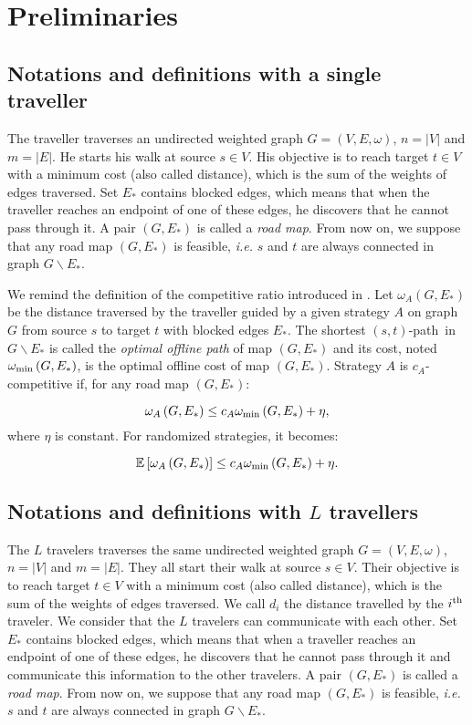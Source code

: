 \documentclass[letter-size, 11pt]{article}
\newcommand{\card}[1]{\left| #1 \right|}
\newcommand{\ith}[1]{#1^{\mbox{\scriptsize{th}}}}
\newcommand{\stpath}{$(s,t)$-path}
\newcommand{\omegamin}{\omega_{\mbox{\scriptsize{min}}}}
\begin{document}
\section{Preliminaries}

\subsection{Notations and definitions with a single traveller} 
The traveller traverses an undirected weighted graph $G=\left(V,E,\omega\right)$, $n = \card{V}$ and $m = \card{E}$. He starts his walk at source $s \in V$. His objective is to reach target $t\in V$ with a minimum cost (also called distance), which is the sum of the weights of edges traversed. Set $E_*$ contains blocked edges, which means that when the traveller reaches an endpoint of one of these edges, he discovers that he cannot pass through it. A pair $\left(G,E_*\right)$ is called a \textit{road map}. From now on, we suppose that any road map $\left(G,E_*\right)$ is feasible, {\em i.e.} $s$ and $t$ are always connected in graph $G\backslash E_*$.

We remind the definition of the competitive ratio introduced in \cite{BoEl98}. Let $\omega_A\left(G,E_*\right)$ be the distance traversed by the traveller guided by a given strategy $A$ on graph $G$ from source $s$ to target $t$ with blocked edges $E_*$. The shortest \stpath ~in $G\backslash E_*$ is called the \textit{optimal offline path} of map $\left(G,E_*\right)$ and its cost, noted $\omegamin\left(G,E_*\right)$, is the optimal offline cost of map $\left(G,E_*\right)$. Strategy $A$ is $c_A$-competitive if, for any road map $\left(G,E_*\right)$:

\[
\omega_A\left(G,E_*\right) \leq c_A\omegamin\left(G,E_*\right) + \eta,
\]
where $\eta$ is constant. For randomized strategies, it becomes:

\[
\mathbb{E}\left[\omega_A\left(G,E_*\right)\right] \leq c_A\omegamin\left(G,E_*\right) + \eta.
\]

\subsection{Notations and definitions with $L$ travellers}

The $L$ travelers traverses the same undirected weighted graph $G=\left(V,E,\omega\right)$, $n = \card{V}$ and $m = \card{E}$. They all start their walk at source $s \in V$. Their objective is to reach target $t\in V$ with a minimum cost (also called distance), which is the sum of the weights of edges traversed. We call $d_i$ the distance travelled by the $\ith{i}$ traveler. We consider that the $L$ travelers can communicate with each other. Set $E_*$ contains blocked edges, which means that when a traveller reaches an endpoint of one of these edges, he discovers that he cannot pass through it and communicate this information to the other travelers. A pair $\left(G,E_*\right)$ is called a \textit{road map}. From now on, we suppose that any road map $\left(G,E_*\right)$ is feasible, {\em i.e.} $s$ and $t$ are always connected in graph $G\backslash E_*$.
\end{document}
